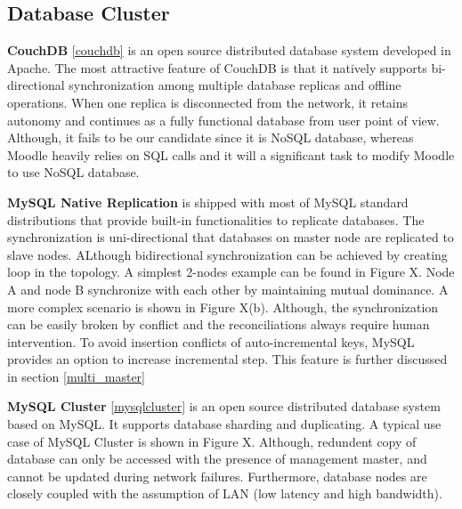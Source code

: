 \subsection{Database Cluster} \label{db_cluster}
\textbf{CouchDB} \ref{couchdb} is an open source distributed database system developed in Apache. The most attractive feature of CouchDB is that it natively supports bi-directional synchronization among multiple database replicas and offline operations. When one replica is disconnected from the network, it retains autonomy and continues as a fully functional database from user point of view. Although, it fails to be our candidate since it is NoSQL database, whereas Moodle heavily relies on SQL calls and it will a significant task to modify Moodle to use NoSQL database.

\textbf{MySQL Native Replication} is shipped with most of MySQL standard distributions that provide built-in functionalities to replicate databases. The synchronization is uni-directional that databases on master node are replicated to slave nodes. ALthough bidirectional synchronization can be achieved by creating loop in the topology. A simplest 2-nodes example can be found in Figure X. Node A and node B synchronize with each other by maintaining mutual dominance. A more complex scenario is shown in Figure X(b). Although, the synchronization can be easily broken by conflict and the reconciliations always require human intervention.
To avoid insertion conflicts of auto-incremental keys, MySQL provides an option to increase incremental step. This feature is further discussed in section \ref{multi_master}


\textbf{MySQL Cluster} \ref{mysqlcluster} is an open source distributed database system based on MySQL. It supports database sharding and duplicating. A typical use case of MySQL Cluster is shown in Figure X. Although, redundent copy of database can only be accessed with the presence of management master, and cannot be updated during network failures. Furthermore, database nodes are closely coupled with the assumption of LAN (low latency and high bandwidth).

